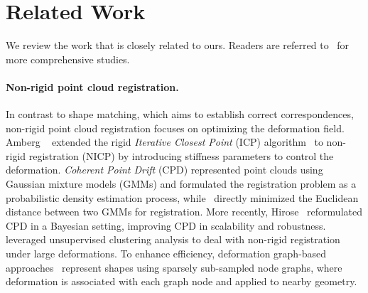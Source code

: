 \section{Related Work}
We review the work that is closely related to ours. Readers are referred to~\citep{tam2012registration,deng2022survey} for more comprehensive studies.


\paragraph{Non-rigid point cloud registration.} In contrast to shape matching, which aims to establish correct correspondences, non-rigid point cloud registration focuses on optimizing the deformation field. Amberg \etal~\citep{amberg2007optimal} extended the rigid \emph{Iterative Closest Point} (ICP) algorithm~\citep{besl1992method} to non-rigid registration (NICP) by introducing stiffness parameters to control the deformation. \emph{Coherent Point Drift} (CPD) represented point clouds using Gaussian mixture models (GMMs) and formulated the registration problem as a probabilistic density estimation process, while~\citep{jian2010robust} directly minimized the Euclidean distance between two GMMs for registration. More recently, Hirose~\citep{hirose2020bayesian,hirose2022geodesic} reformulated CPD in a Bayesian setting, improving CPD in scalability and robustness. \cite{zhao2024correspondence} leveraged unsupervised clustering analysis to deal with non-rigid registration under large deformations. To enhance efficiency, deformation graph-based approaches~\citep{sumner2007embedded,bozic2021neural,zhao2022graphreg,qin2023deep} represent shapes using sparsely sub-sampled node graphs, where deformation is associated with each graph node and applied to nearby geometry. 


